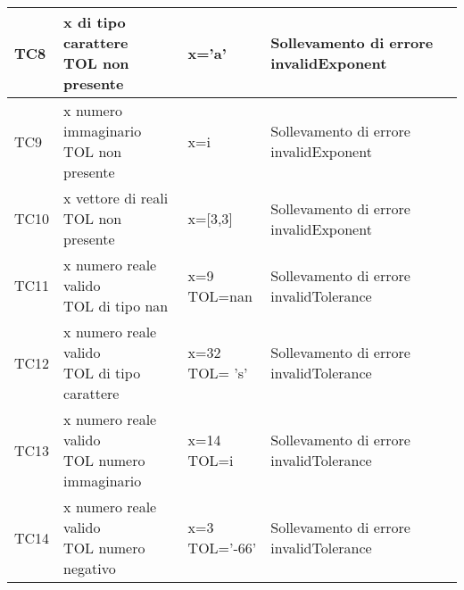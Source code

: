 \documentclass[a4paper,titlepage]{article}
\begin{document}
{{\begin{tabularx}{1.325\textwidth}{| l | l | l | l | }
				TC8 & \pbox{20cm}{\vspace{.5\baselineskip}x di tipo carattere\\ TOL non presente \vspace{.5\baselineskip}}											& x='a' 		& Sollevamento di errore invalidExponent \\ \hline
				TC9 & \pbox{20cm}{\vspace{.5\baselineskip}x numero immaginario\\ TOL non presente \vspace{.5\baselineskip}}											& x=i 			& Sollevamento di errore invalidExponent \\ \hline
				TC10 &\pbox{20cm}{\vspace{.5\baselineskip}x vettore di reali\\ TOL non presente \vspace{.5\baselineskip}}											& x=[3,3] 		& Sollevamento di errore invalidExponent \\ \hline
				TC11 & \pbox{20cm}{\vspace{.5\baselineskip}x numero reale valido\\ TOL di tipo nan \vspace{.5\baselineskip}}										& \pbox{20cm}{x=9\\ TOL=nan} 	& Sollevamento di errore invalidTolerance \\ \hline
				TC12 & \pbox{20cm}{\vspace{.5\baselineskip}x numero reale valido\\ TOL di tipo carattere \vspace{.5\baselineskip}}									& \pbox{20cm}{x=32\\ TOL= 's'}& Sollevamento di errore invalidTolerance \\ \hline
				TC13 & \pbox{20cm}{\vspace{.5\baselineskip}x numero reale valido\\ TOL numero immaginario \vspace{.5\baselineskip}}									& \pbox{20cm}{x=14\\ TOL=i} 	& Sollevamento di errore invalidTolerance \\ \hline
				TC14 & \pbox{20cm}{\vspace{.5\baselineskip}x numero reale valido\\ TOL numero negativo \vspace{.5\baselineskip}}									& \pbox{20cm}{x=3\\ TOL='-66'}	& Sollevamento di errore invalidTolerance \\ \hline

\end{tabularx}}}
\end{document}
